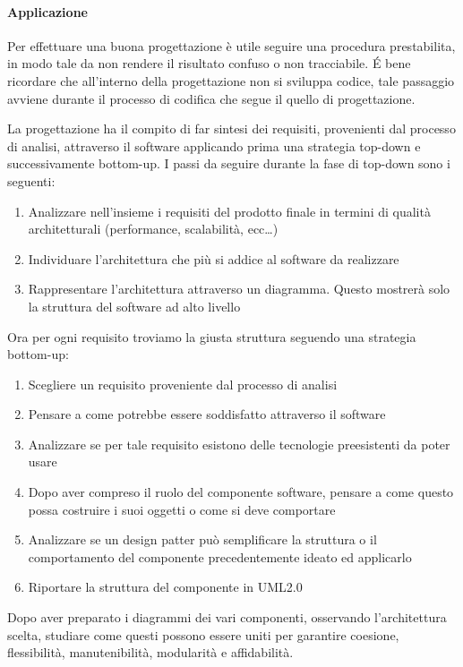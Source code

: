         \paragraph{Applicazione} \label{PP:progettazione:applicazione}
        Per effettuare una buona progettazione è utile seguire una procedura prestabilita, in modo tale da non rendere il risultato confuso o non tracciabile. \'E bene ricordare che all'interno della progettazione non si sviluppa codice, tale passaggio avviene durante il processo di codifica che segue il quello di progettazione. \par
        La progettazione ha il compito di far sintesi dei requisiti, provenienti dal processo di analisi, attraverso il software applicando prima una strategia top-down e successivamente bottom-up. I passi da seguire durante la fase di top-down sono i seguenti:
        \begin{enumerate}
            \item Analizzare nell'insieme i requisiti del prodotto finale in termini di qualità architetturali (performance, scalabilità, ecc\dots)
            \item Individuare l'architettura che più si addice al software da realizzare
            \item Rappresentare l'architettura attraverso un diagramma. Questo mostrerà solo la struttura del software ad alto livello
        \end{enumerate}
        Ora per ogni requisito troviamo la giusta struttura seguendo una strategia bottom-up:
        \begin{enumerate}
            \item Scegliere un requisito proveniente dal processo di analisi
            \item Pensare a come potrebbe essere soddisfatto attraverso il software
            \item Analizzare se per tale requisito esistono delle tecnologie preesistenti da poter usare
            \item Dopo aver compreso il ruolo del componente software, pensare a come questo possa costruire i suoi oggetti o come si deve comportare
            \item Analizzare se un design patter può semplificare la struttura o il comportamento del componente precedentemente ideato ed applicarlo
            \item Riportare la struttura del componente in UML2.0
        \end{enumerate}
        Dopo aver preparato i diagrammi dei vari componenti, osservando l'architettura scelta, studiare come questi possono essere uniti per garantire coesione, flessibilità, manutenibilità, modularità e affidabilità.

